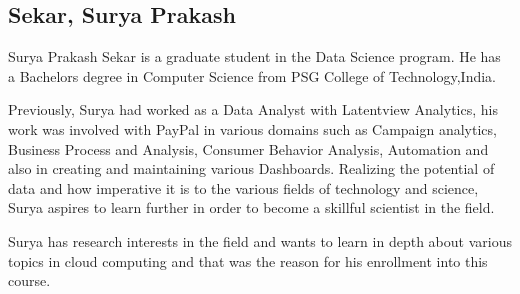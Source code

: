 \subsection{ Sekar, Surya Prakash}

Surya Prakash Sekar is a graduate student in the Data Science program. He has a
Bachelors degree in Computer Science from PSG College of Technology,India.

Previously, Surya had worked as a Data Analyst with Latentview Analytics,
his work was involved with PayPal in various domains such as Campaign analytics,
Business Process and Analysis, Consumer Behavior Analysis, Automation and also 
in creating and maintaining various Dashboards. Realizing the potential of data 
and how imperative it is to the various fields of technology and science, Surya 
aspires to learn further in order to become a skillful scientist in the field.

Surya has research interests in the field and wants to learn in depth about
various topics in cloud computing and that was the reason for his enrollment 
into this course.
